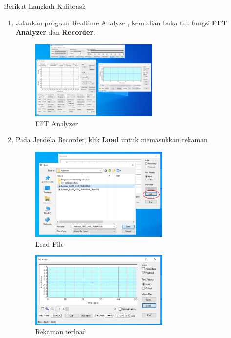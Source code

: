 \documentclass[12pt]{book}
\begin{document}
    Berikut Langkah Kalibrasi:
    \begin{enumerate}
    	\item Jalankan program Realtime Analyzer, kemudian buka tab fungsi \textbf{FFT Analyzer} dan \textbf{Recorder}.
    	\begin{figure}[!ht]
    		\centering
    		\includegraphics[width=0.6\textwidth]{images/kalibrasi/fft_analyzer}
    		\caption{FFT Analyzer}
    	\end{figure}

    	\newpage
    	\item Pada Jendela Recorder, klik \textbf{Load} untuk memasukkan rekaman
    	\begin{figure}[!ht]
    		\centering
    		\includegraphics[width=0.65\textwidth]{images/kalibrasi/load_file}
    		\caption{Load File}
    	\end{figure}

    	\begin{figure}[!ht]
    		\centering
    		\includegraphics[width=0.65\textwidth]{images/kalibrasi/loaded}
    		\caption{Rekaman terload}
    	\end{figure}


\end{enumerate}
\end{document}
